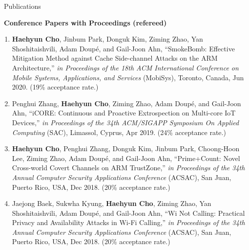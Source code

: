 \documentclass{resume} %
\makeatletter
\newlength{\bibhang}
\newlength{\bibsep}
{\@listi \global\bibsep\itemsep \global\advance\bibsep by\parsep}
\newenvironment{bibsection}%
{\begin{enumerate}{}{%
			\setlength{\leftmargin}{\bibhang}%
			\setlength{\itemindent}{-\leftmargin}%
			\setlength{\itemsep}{\bibsep}%
			\setlength{\parsep}{\z@}%
			\setlength{\partopsep}{0pt}%
			\setlength{\topsep}{0pt}}}
	{\end{enumerate}\vspace{-.6\baselineskip}}
\makeatother
\begin{document}

\begin{rSection}{\faGenderless~Publications}

    \strut\textbullet~{\bf Conference Papers with Proceedings (refereed)}
	\begin{bibsection}
        \item {\bf Haehyun Cho}, Jinbum Park, Donguk Kim, Ziming Zhao, Yan Shoshitaishvili, Adam Doup\'e, and Gail-Joon Ahn,
		``SmokeBomb: Effective Mitigation Method against Cache Side-channel Attacks on the ARM Architecture,'' 
        \emph{in Proceedings of the 18th ACM International Conference on Mobile Systems, Applications, and Services} (MobiSys), 
		Toronto, Canada, Jun 2020. (19\% acceptance rate.)

		\item Penghui Zhang, {\bf Haehyun Cho}, Ziming Zhao, Adam Doup\'e, and Gail-Joon Ahn,
		``iCORE: Continuous and Proactive Extrospection on Multi-core IoT Devices,'' 
        \emph{in Proceedings of the 34th ACM/SIGAPP Symposium On Applied Computing} (SAC), 
		Limassol, Cyprus, Apr 2019. (24\% acceptance rate.)
     
        \item {\bf Haehyun Cho}, Penghui Zhang, Donguk Kim, Jinbum Park, Choong-Hoon Lee, Ziming Zhao, Adam Doup\'e, and Gail-Joon Ahn,
		``Prime+Count: Novel Cross-world Covert Channels on ARM TrustZone,'' 
        \emph{in Proceedings of the 34th Annual Computer Security Applications Conference} (ACSAC), 
		San Juan, Puerto Rico, USA, Dec 2018. (20\% acceptance rate.)

		\item Jaejong Baek, Sukwha Kyung, {\bf Haehyun Cho}, Ziming Zhao, Yan Shoshitaishvili, Adam Doup\'e, and Gail-Joon Ahn,
		``Wi Not Calling: Practical Privacy and Availability Attacks in Wi-Fi Calling,'' 
        \emph{in Proceedings of the 34th Annual Computer Security Applications Conference} (ACSAC), 
		San Juan, Puerto Rico, USA, Dec 2018. (20\% acceptance rate.)


\end{bibsection}
\end{rSection}
\end{document}
